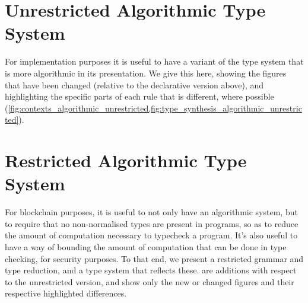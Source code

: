\documentclass[a4paper]{article}
\begin{document}
\begin{appendices}
\section{Unrestricted Algorithmic Type System}
\label{sec:algorithmic}

For implementation purposes it is useful to have a variant of the type
system that is more algorithmic in its presentation. We give this
here, showing the figures that have been changed (relative to the
declarative version above), and highlighting the specific parts of
each rule that is different, where possible (\cref{fig:contexts_algorithmic_unrestricted,fig:type_synthesis_algorithmic_unrestricted}).



\newpage

\section{Restricted Algorithmic Type System}
\label{sec:restricted-algorithmic}

For blockchain purposes, it is useful to not only have an algorithmic
system, but to require that no non-normalised types are present in
programs, so as to reduce the amount of computation necessary to
typecheck a program. It's also useful to have a way of bounding the
amount of computation that can be done in type checking, for security
purposes. To that end, we present a restricted grammar and type
reduction, and a type system that reflects these.
are additions with respect to the unrestricted version, and show only
the new or changed figures and their respective highlighted
differences.







\end{appendices}


\end{document}
